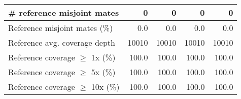 \documentclass[12pt,a4paper]{article}
\begin{document}
\begin{table}[ht]
\begin{center}
\begin{tabular}{|l*{4}{|r}|}
\# reference misjoint mates & 0 & 0 & 0 & 0 \\ \hline
Reference misjoint mates (\%) & 0.0 & 0.0 & 0.0 & 0.0 \\ \hline
Reference avg. coverage depth & 10010 & 10010 & 10010 & 10010 \\ \hline
Reference coverage $\geq$ 1x (\%) & 100.0 & 100.0 & 100.0 & 100.0 \\ \hline
Reference coverage $\geq$ 5x (\%) & 100.0 & 100.0 & 100.0 & 100.0 \\ \hline
Reference coverage $\geq$ 10x (\%) & 100.0 & 100.0 & 100.0 & 100.0 \\ \hline
\end{tabular}
\end{center}
\end{table}
\end{document}
